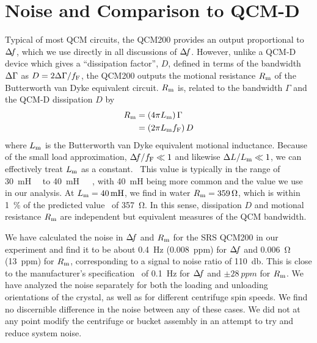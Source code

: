 \section{Noise and Comparison to QCM-D} \label{sec:suppqcmdcomp}
Typical of most QCM circuits, the QCM200 provides an output proportional to
$\Delta\!f$, which we use directly in all discussions of $\Delta\!f$.  However, unlike
a QCM-D device which gives a ``dissipation factor'', $D$, defined in
terms of the bandwidth $\Delta\Gamma$ as $D=2\Delta\Gamma/f_\mathrm{F}$, the QCM200
outputs the motional resistance $R_\mathrm{m}$ of the Butterworth van Dyke
equivalent circuit.  $R_\mathrm{m}$ is, related to
the bandwidth $\Gamma$ and the QCM-D dissipation $D$ by 
\begin{align}
 R_\mathrm{m}&=\left(4 \pi L_\mathrm{m}\right) \Gamma\\
 &=\left(2 \pi L_\mathrm{m} f_\mathrm{F}\right) D
\end{align}
where $L_\mathrm{m}$ is the Butterworth van Dyke equivalent motional inductance.
Because of the small load approximation, $\Delta\!f/f_\mathrm{F} \ll 1$ and
likewise $\Delta L/L_\mathrm{m} \ll 1$, we can effectively treat $L_\mathrm{m}$ as a
constant.~\cite{geelhood2002transient}
This value is
typically in the range of
\SI{30}{\milli\henry}~\cite{srsqcm200manual}~\cite{hussain2005ots} to
\SI{40}{\milli\henry}~\cite{gottschling2000detection}~\cite{arnau2002circuit}~\cite{snellings2001response},
with \SI{40}{\milli\henry} being more common and the value we use in our
analysis.  At $\Lm=\SI{40}{\milli\henry}$, we find in water
$R_\mathrm{m}=\SI{359}{\ohm}$, which is within \SI{1}{\percent} of the predicted
value~\cite{kanazawa1985frequency} of \SI{357}{\ohm}.  In this sense,
dissipation $D$ and motional resistance $R_\mathrm{m}$ are independent but
equivalent measures of the QCM bandwidth.

We have calculated the noise in $\Delta\!f$ and $R_\mathrm{m}$ for the SRS QCM200 in our
experiment and find it to be about \SI{0.4}{\hertz} (\SI{0.008}{ppm}) for
$\Delta\!f$ and \SI{0.006}{\ohm} (\SI{13}{ppm}) for $R_\mathrm{m}$, corresponding to a
signal to noise ratio of \SI{110}{\decibel}.  This is close to the
manufacturer's specification~\cite{srsqcm200manual} of \SI{0.1}{\hertz} for
$\Delta\!f$ and $\pm\SI{28}{ppm}$ for $R_\mathrm{m}$.  We have analyzed the noise
separately for both the loading and unloading orientations of the crystal,
as well as for different centrifuge spin speeds.  We find no discernible
difference in the noise between any of these cases.  We did not at any
point modify the centrifuge or bucket assembly in an attempt to try and
reduce system noise.

